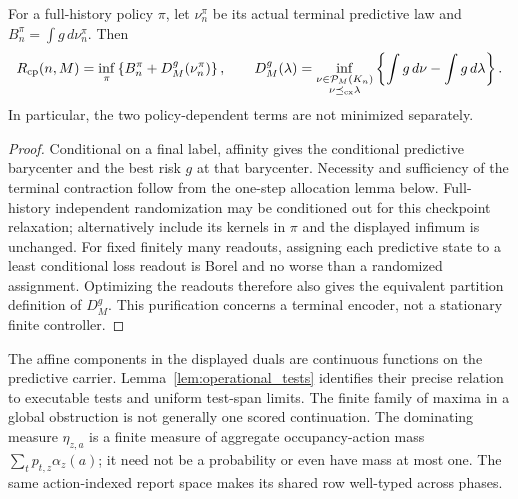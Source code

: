 \begin{proposition}\label{prop:checkpoint}
For a full-history policy $\pi$, let $\nu_n^\pi$ be its actual terminal predictive law and $B_n^\pi=\int g\,d\nu_n^\pi$. Then
\begin{equation}\label{eq:checkpoint}
 R_{\mathrm{cp}}(n,M)=\inf_\pi\left\{B_n^\pi+D_M^g(\nu_n^\pi)\right\},\qquad
 D_M^g(\lambda)=\inf_{\substack{\nu\in\mathcal P_M(K_n)\\\nu\preceq_{\rm cx}\lambda}}
                      \left\{\int g\,d\nu-\int g\,d\lambda\right\}.
\end{equation}
In particular, the two policy-dependent terms are not minimized separately.
\end{proposition}
\begin{proof}
Conditional on a final label, affinity gives the conditional predictive barycenter and the best risk $g$ at that barycenter. Necessity and sufficiency of the terminal contraction follow from the one-step allocation lemma below. Full-history independent randomization may be conditioned out for this checkpoint relaxation; alternatively include its kernels in $\pi$ and the displayed infimum is unchanged. For fixed finitely many readouts, assigning each predictive state to a least conditional loss readout is Borel and no worse than a randomized assignment. Optimizing the readouts therefore also gives the equivalent partition definition of $D_M^g$. This purification concerns a terminal encoder, not a stationary finite controller.
\end{proof}

The affine components in the displayed duals are continuous functions on the predictive carrier. Lemma~\ref{lem:operational_tests} identifies their precise relation to executable tests and uniform test-span limits. The finite family of maxima in a global obstruction is not generally one scored continuation. The dominating measure $\eta_{z,a}$ is a finite measure of aggregate occupancy-action mass $\sum_t p_{t,z}\alpha_z(a)$; it need not be a probability or even have mass at most one. The same action-indexed report space makes its shared row well-typed across phases.
